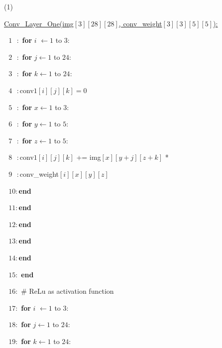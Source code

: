 \documentclass[11pt]{article}
\begin{document}
\setcounter{page}{2}
\begin{solution}
(1) \item \qquad \underline{Conv\_Layer\_One(img$[3][28][28]$, conv\_weight$[3][3][5][5]$):}
\item \qquad $\text{  } 1 \text{   }:$\textbf{ for} $i$ $\leftarrow 1$ to $3$:
\item \qquad $\text{  } 2 \text{   }:$\qquad  \textbf{ for} $j \leftarrow 1$ to $24$: 
\item \qquad $\text{  } 3 \text{   }:$\qquad  \qquad  \textbf{ for} $k \leftarrow 1$ to $24$: 
\item \qquad $\text{  } 4 \text{   }:$\qquad  \qquad \qquad conv$1[i][j][k]=0$ 
\item \qquad $\text{  } 5 \text{   }:$\qquad  \qquad \qquad \qquad  \textbf{ for} $x \leftarrow 1$ to $3$: 
\item \qquad $\text{  } 6 \text{   }:$\qquad  \qquad \qquad \qquad \qquad \textbf{ for} $y \leftarrow 1$ to $5$: 
\item \qquad $\text{  } 7 \text{   }:$\qquad  \qquad \qquad \qquad \qquad \qquad \textbf{ for} $z \leftarrow 1$ to $5$: 
\item \qquad $\text{  } 8 \text{   }:$\qquad  \qquad \qquad \qquad \qquad \qquad \qquad conv$1[i][j][k]$ += img$[x][y+j][z+k]$ *
\item \qquad $\text{  } 9\text{   }:$\qquad  \qquad \qquad \qquad \qquad \qquad \qquad \qquad \qquad \qquad \qquad conv\_weight$[i][x][y][z]$
\item \qquad $\text{  } 10:$\qquad  \qquad \qquad \qquad \qquad \qquad \textbf{end} 
\item \qquad $\text{  } 11:$\qquad  \qquad \qquad \qquad \qquad  \textbf{end} 
\item \qquad $\text{  } 12:$\qquad  \qquad \qquad \qquad \textbf{end} 
\item \qquad $\text{  } 13:$\qquad  \qquad  \textbf{end} 
\item \qquad $\text{  } 14:$\qquad    \textbf{end} 
\item \qquad $\text{  } 15:$  \textbf{end} 
\item \qquad $\text{  } 16:$ \# ReLu as activation function
\item \qquad $\text{  } 17:$\textbf{ for} $i$ $\leftarrow 1$ to $3$:
\item \qquad $\text{  } 18:$\qquad  \textbf{ for} $j \leftarrow 1$ to $24$: 
\item \qquad $\text{  } 19:$\qquad  \qquad  \textbf{ for} $k \leftarrow 1$ to $24$: 

\end{solution}
\end{document}
